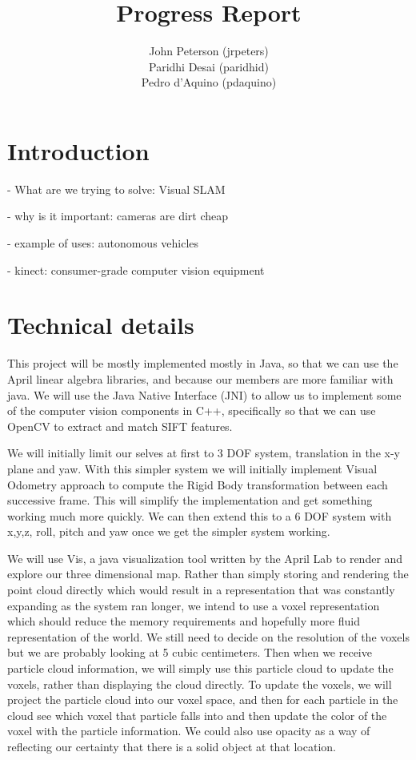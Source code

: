 \documentclass[12pt]{article}
\title{Progress Report}
\author{
	John Peterson (jrpeters)\\
	Paridhi Desai (paridhid)\\
	Pedro d'Aquino (pdaquino)}
\begin{document}
\maketitle

\section{Introduction}
- What are we trying to solve: Visual SLAM

- why is it important: cameras are dirt cheap

- example of uses: autonomous vehicles

- kinect: consumer-grade computer vision equipment

\section{Technical details}
This project will be mostly implemented mostly in Java, so that we can use the April linear algebra libraries, and because our members are more familiar with java.  We will use the Java Native Interface (JNI) to allow us to implement some of the computer vision components in C++, specifically so that we can use OpenCV to extract and match SIFT features.

	We will initially limit our selves at first to 3 DOF system, translation in the x-y plane and yaw.  With this simpler system we will initially implement Visual Odometry approach to compute the Rigid Body transformation between each successive frame. This will simplify the implementation and get something working much more quickly.   We can then extend this to a 6 DOF system with x,y,z, roll, pitch and yaw once we get the simpler system working.
	
We will use Vis, a java visualization tool written by the April Lab to render and explore our three dimensional map.   Rather than simply storing and rendering the point cloud directly which would result in a representation that was constantly expanding as the system ran longer, we intend to use a voxel representation which should reduce the memory requirements and hopefully more fluid representation of the world.  We still need to decide on the resolution of the voxels but we are probably looking at 5 cubic centimeters.  Then when we receive particle cloud information, we will simply use this particle cloud to update the voxels, rather than displaying the cloud directly.   To update the voxels, we will project the particle cloud into our voxel space, and then for each particle in the cloud see which voxel that particle falls into and then update the color of the voxel with the particle information.  We could also use opacity as a way of reflecting our certainty that there is a solid object at that location. 
\end{document}
